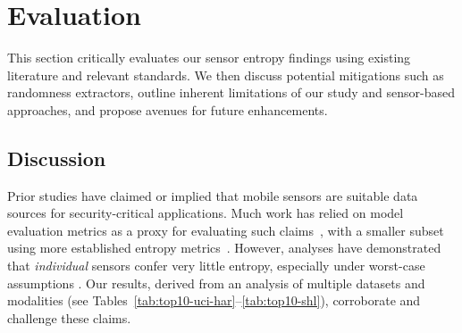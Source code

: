 \section{Evaluation} \label{sec:security-evaluation}

This section critically evaluates our sensor entropy findings using existing literature and relevant standards. We then discuss potential mitigations such as randomness extractors, outline inherent limitations of our study and sensor-based approaches, and propose avenues for future enhancements.





\subsection{Discussion}
Prior studies have claimed or implied that mobile sensors are suitable data sources for security-critical applications. Much work has relied on model evaluation metrics as a proxy for evaluating such claims~\cite{mehrnezhad2015tap,gurulian2018good,markantonakis2024using,shrestha2014drone}, with a smaller subset using more established entropy metrics~\cite{wu2024t2pair,li2020t2pair}. However, analyses have demonstrated that \emph{individual} sensors confer very little entropy, especially under worst-case assumptions \cite{lv2020analysis,hennebert2013entropy,voris2011accelerometers,krhovjak2007sources}. Our results, derived from an analysis of multiple datasets and modalities (see Tables~\ref{tab:top10-uci-har}--\ref{tab:top10-shl}), corroborate and challenge these claims.

